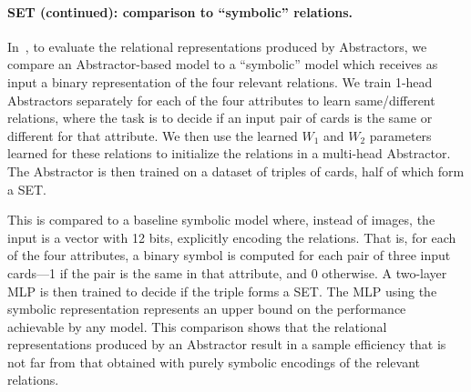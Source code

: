 \paragraph{SET (continued): comparison to ``symbolic'' relations.}
In~, to evaluate the relational representations produced by Abstractors, we compare an Abstractor-based model to a ``symbolic'' model which receives as input a binary representation of the four relevant relations. We train 1-head Abstractors separately for each of the four attributes to learn same/different relations, where the task is to decide if an input pair of cards is the same or different for that attribute. We then use the learned $W_1$ and $W_2$ parameters learned for these relations to initialize the relations in a multi-head Abstractor. The Abstractor is then trained on a dataset of triples of cards, half of which form a SET.

This is compared to a baseline symbolic model where, instead of images, the input is a vector with 12 bits,
explicitly encoding the relations. That is, for each of the four attributes, a binary symbol is computed for each pair of three input cards---1 if the pair is the same in that attribute, and 0 otherwise. A two-layer MLP is then trained to decide if the triple forms a SET. The MLP using the symbolic representation represents an upper bound on the performance achievable by any model. This comparison shows that the relational representations produced by an Abstractor result in a sample efficiency that is not far from that obtained with purely symbolic encodings of the relevant relations.



